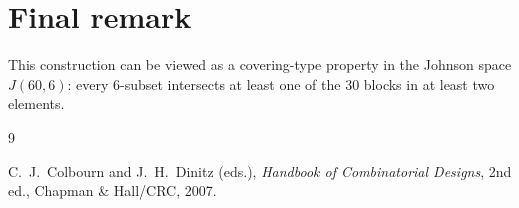 \documentclass[10pt]{article}
\begin{document}
\section{Final remark}
This construction can be viewed as a covering-type property in the Johnson space $J(60,6)$:
every $6$-subset intersects at least one of the $30$ blocks in at least two elements.

\begin{thebibliography}{9}

C.~J.~Colbourn and J.~H.~Dinitz (eds.),
\emph{Handbook of Combinatorial Designs}, 2nd ed.,
Chapman \& Hall/CRC, 2007.

\end{thebibliography}
\end{document}
